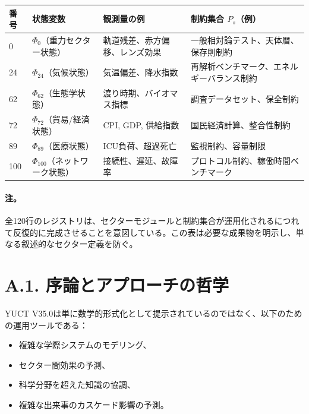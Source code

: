 \documentclass[13pt,a4paper]{ltjsarticle}
\begin{document}
	\begin{longtable}{|p{0.8cm}|p{4.2cm}|p{4.5cm}|p{4.7cm}|}
		\hline
		\textbf{番号} & \textbf{状態変数} & \textbf{観測量の例} & \textbf{制約集合 $P_s$（例）} \\
		\hline
		\endhead
		0 & $\Phi_0$（重力セクター状態） & 軌道残差、赤方偏移、レンズ効果 & 一般相対論テスト、天体暦、保存則制約 \\
		\hline
		24 & $\Phi_{24}$（気候状態） & 気温偏差、降水指数 & 再解析ベンチマーク、エネルギーバランス制約 \\
		\hline
		62 & $\Phi_{62}$（生態学状態） & 渡り時期、バイオマス指標 & 調査データセット、保全制約 \\
		\hline
		72 & $\Phi_{72}$（貿易/経済状態） & CPI, GDP, 供給指数 & 国民経済計算、整合性制約 \\
		\hline
		89 & $\Phi_{89}$（医療状態） & ICU負荷、超過死亡 & 監視制約、容量制限 \\
		\hline
		100 & $\Phi_{100}$（ネットワーク状態） & 接続性、遅延、故障率 & プロトコル制約、稼働時間ベンチマーク \\
		\hline
	\end{longtable}
	
	\paragraph{注。}
	全120行のレジストリは、セクターモジュールと制約集合が運用化されるにつれて反復的に完成させることを意図している。この表は必要な成果物を明示し、単なる叙述的なセクター定義を防ぐ。
	
	\section*{A.1. 序論とアプローチの哲学}
	
	YUCT V35.0は単に数学的形式化として提示されているのではなく、以下のための運用ツールである：
	\begin{itemize}[leftmargin=*]
		\item 複雑な学際システムのモデリング、
		\item セクター間効果の予測、
		\item 科学分野を超えた知識の協調、
		\item 複雑な出来事のカスケード影響の予測。
	\end{itemize}
\end{document}
